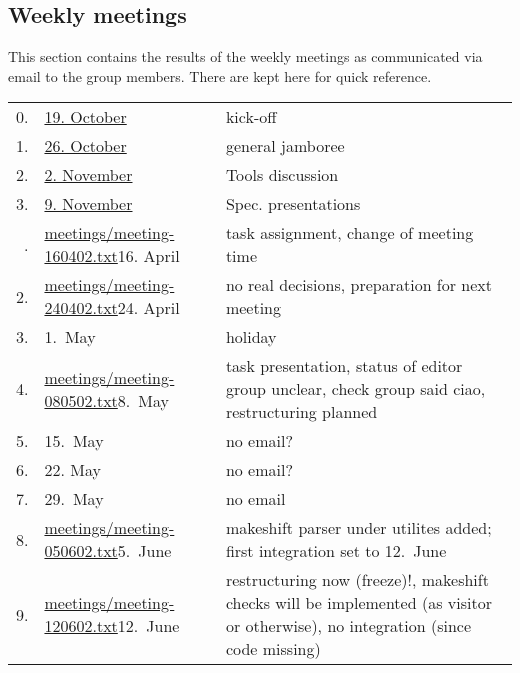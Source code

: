 
\subsection*{Weekly meetings}
\label{sec:meetings}


This section contains the results of the weekly meetings as communicated
via email to the group members. There are kept here for quick reference.




  \begin{table}[htbp]
    \centering
    \begin{tabular}[t]{r@{\quad}l@{\quad\quad}p{9cm}}
    \\\hline
    0.
    &
    \href{meetings/2004-10-19.txt}{19. October}
    &
    kick-off
    \\
    1.
    &
    \href{meetings/2004-10-26.txt}{26. October}
    &
    general jamboree
    \\
    2.
    &
    \href{meetings/2004-11-02.txt}{2. November}
    &
    Tools discussion
    \\
    3.
    &
    \href{meetings/2004-11-09.txt}{9. November}
    &
    Spec. presentations
    \\\hline
\iffalse
    1.
    &
    \url{meetings/meeting-160402.txt}{16. April}
    &
    task assignment, change of meeting time
    \\
    2.
    & 
    \url{meetings/meeting-240402.txt}{24. April}
    &
    no real decisions, preparation for next meeting
    \\
    3.
    &
    1.\ May
    &
    holiday
    \\
    4.
    &
    \url{meetings/meeting-080502.txt}{8.\ May}
    & 
    task presentation, status of editor group unclear,
    check group said ciao, restructuring planned
    \\
    5.
    &
    15.\ May
    &
    no email?
    \\
    6.
    &
    22. May
    &
    no email?
    \\
    7.
    &
    29.\ May
    &
    no email
    \\
    8.
    &
    \url{meetings/meeting-050602.txt}{5.\ June}
    &
    makeshift parser under utilites added; first
    integration set to 12.\ June
    \\
    9.
    &
    \url{meetings/meeting-120602.txt}{12.\ June}
    &
    restructuring now (freeze)!, makeshift checks will be implemented 
    (as visitor or otherwise), no integration (since code
    missing)
    \\

\end{tabular}
\end{table}
